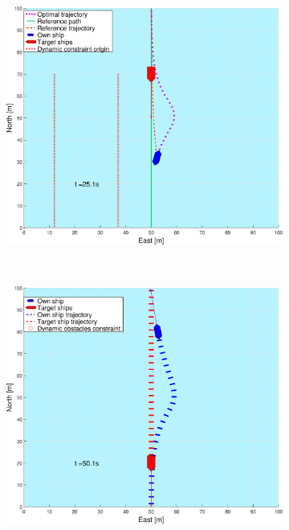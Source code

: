\begin{figure}[ht!]
\begin{subfigure}[b]{0.49\textwidth}
        \subcaption{}
    \end{subfigure}
    \hfill
    \begin{subfigure}[b]{0.499\textwidth}
        \centering
        \includegraphics[width=\textwidth]{Images/Figures/enkel_HO/_Simple_0fig999_time=25}
        \subcaption{}
    \end{subfigure}
    \hfill
    \\
    \begin{subfigure}[b]{0.49\textwidth}
        \centering
        \includegraphics[width=\textwidth]{Images/Figures/enkel_HO/_Simple_0fig1_time=50}

\end{subfigure}
\end{figure}
